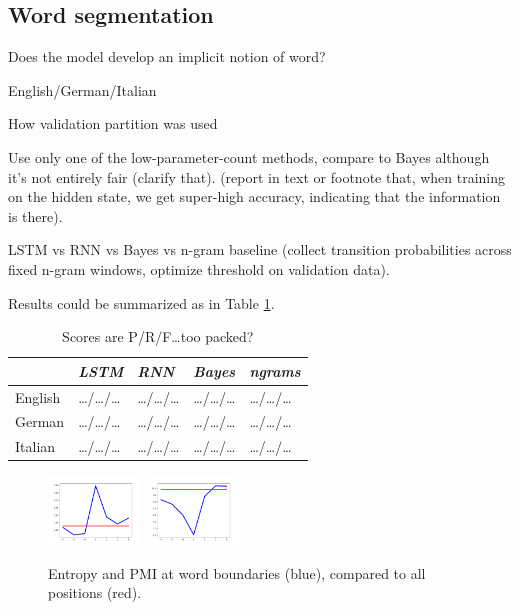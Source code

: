 \subsection{Word segmentation}
\label{sec:segmentation}


Does the model develop an implicit notion of word?

English/German/Italian

How validation partition was used

Use only one of the low-parameter-count methods, compare to Bayes
although it's not entirely fair (clarify that). (report in text or
footnote that, when training on the hidden state, we get super-high
accuracy, indicating that the information is there).

LSTM vs RNN vs Bayes vs n-gram baseline (collect transition
probabilities across fixed n-gram windows, optimize threshold on
validation data).

Results could be summarized as in Table \ref{tab:segmentation-results}.


\begin{table}[t]
  \begin{center}
    \begin{tabular}{l|l|l|l|l}
      \multicolumn{1}{c}{}&\emph{LSTM}&\emph{RNN}&\emph{Bayes}&\emph{ngrams}\\
      \hline
      English &\ldots{}/\ldots{}/\ldots & \ldots{}/\ldots{}/\ldots & \ldots{}/\ldots{}/\ldots &\ldots{}/\ldots{}/\ldots\\
      German &\ldots{}/\ldots{}/\ldots & \ldots{}/\ldots{}/\ldots & \ldots{}/\ldots{}/\ldots &\ldots{}/\ldots{}/\ldots\\
      Italian &\ldots{}/\ldots{}/\ldots & \ldots{}/\ldots{}/\ldots & \ldots{}/\ldots{}/\ldots &\ldots{}/\ldots{}/\ldots\\
    \end{tabular}
  \end{center}
  \caption{\label{tab:segmentation-results} Scores are P/R/F\ldots too packed?}
\end{table}



\begin{figure}
\includegraphics[width=0.22\textwidth]{figures/segmentation-profile-flattened-entropies-german.png}
\includegraphics[width=0.22\textwidth]{figures/segmentation-profile-flattened-pmis-german.png}
	\caption{Entropy and PMI at word boundaries (blue), compared to all positions (red). }\label{fig:syntax-depth}
\end{figure}






